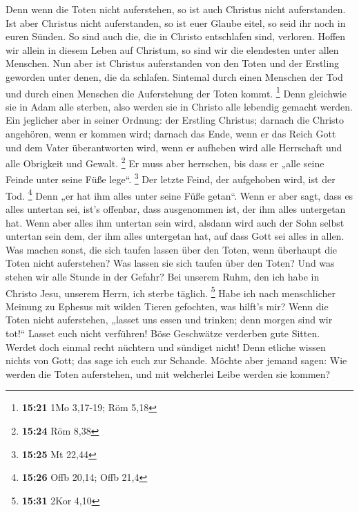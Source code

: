  Denn wenn die Toten nicht auferstehen, so ist auch
Christus nicht auferstanden.  Ist aber Christus nicht
auferstanden, so ist euer Glaube eitel, so seid ihr noch in euren
Sünden.  So sind auch die, die in Christo entschlafen
sind, verloren.  Hoffen wir allein in diesem Leben auf
Christum, so sind wir die elendesten unter allen Menschen.
 Nun aber ist Christus auferstanden von den Toten und der
Erstling geworden unter denen, die da schlafen.  Sintemal
durch einen Menschen der Tod und durch einen Menschen die Auferstehung
der Toten kommt. \footnote{\textbf{15:21} 1Mo 3,17-19; Röm 5,18}
 Denn gleichwie sie in Adam alle sterben, also werden sie
in Christo alle lebendig gemacht werden.  Ein jeglicher
aber in seiner Ordnung: der Erstling Christus; darnach die Christo
angehören, wenn er kommen wird;  darnach das Ende, wenn
er das Reich Gott und dem Vater überantworten wird, wenn er aufheben
wird alle Herrschaft und alle Obrigkeit und Gewalt. \footnote{\textbf{15:24}
  Röm 8,38}  Er muss aber herrschen, bis dass er „alle
seine Feinde unter seine Füße lege``. \footnote{\textbf{15:25} Mt 22,44}
 Der letzte Feind, der aufgehoben wird, ist der Tod.
\footnote{\textbf{15:26} Offb 20,14; Offb 21,4}  Denn „er
hat ihm alles unter seine Füße getan``. Wenn er aber sagt, dass es alles
untertan sei, ist's offenbar, dass ausgenommen ist, der ihm alles
untergetan hat.  Wenn aber alles ihm untertan sein wird,
alsdann wird auch der Sohn selbst untertan sein dem, der ihm alles
untergetan hat, auf dass Gott sei alles in allen.  Was
machen sonst, die sich taufen lassen über den Toten, wenn überhaupt die
Toten nicht auferstehen? Was lassen sie sich taufen über den Toten?
 Und was stehen wir alle Stunde in der Gefahr?
 Bei unserem Ruhm, den ich habe in Christo Jesu, unserem
Herrn, ich sterbe täglich. \footnote{\textbf{15:31} 2Kor 4,10}
 Habe ich nach menschlicher Meinung zu Ephesus mit wilden
Tieren gefochten, was hilft's mir? Wenn die Toten nicht auferstehen,
„lasset uns essen und trinken; denn morgen sind wir tot!{}``
 Lasset euch nicht verführen! Böse Geschwätze verderben
gute Sitten.  Werdet doch einmal recht nüchtern und
sündiget nicht! Denn etliche wissen nichts von Gott; das sage ich euch
zur Schande.  Möchte aber jemand sagen: Wie werden die
Toten auferstehen, und mit welcherlei Leibe werden sie kommen?
